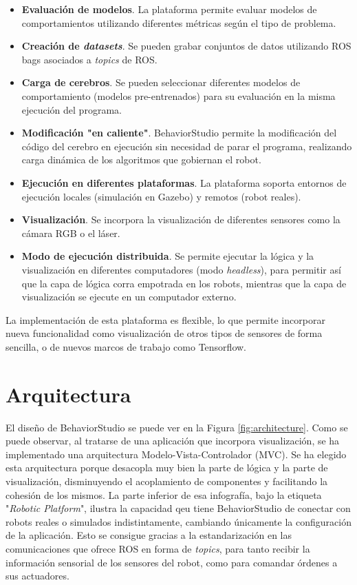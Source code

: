 \begin{itemize}
    \item \textbf{Evaluación de modelos}. La plataforma permite evaluar modelos de comportamientos utilizando diferentes métricas según el tipo de problema.
    \item \textbf{Creación de \textit{datasets}}. Se pueden grabar conjuntos de datos utilizando ROS bags asociados a \textit{topics} de ROS.
    \item \textbf{Carga de cerebros}. Se pueden seleccionar diferentes modelos de comportamiento (modelos pre-entrenados) para su evaluación en la misma ejecución del programa.
    \item \textbf{Modificación "en caliente"}. BehaviorStudio permite la modificación del código del cerebro en ejecución sin necesidad de parar el programa, realizando carga dinámica de los algoritmos que gobiernan el robot.
    \item \textbf{Ejecución en diferentes plataformas}. La plataforma soporta entornos de ejecución locales (simulación en Gazebo) y remotos (robot reales).
    \item \textbf{Visualización}. Se incorpora la visualización de diferentes sensores como la cámara RGB o el láser.
    \item \textbf{Modo de ejecución distribuida}. Se permite ejecutar la lógica y la visualización en diferentes computadores (modo \textit{headless}), para permitir así que la capa de lógica corra empotrada en los robots, mientras que la capa de visualización se ejecute en un computador externo.
\end{itemize}

La implementación de esta plataforma es flexible, lo que permite incorporar nueva funcionalidad como visualización de otros tipos de sensores de forma sencilla, o de nuevos marcos de trabajo como Tensorflow.

\section{Arquitectura}

El diseño de BehaviorStudio se puede ver en la Figura \ref{fig:architecture}. Como se puede observar, al tratarse de una aplicación que incorpora visualización, se ha implementado una arquitectura Modelo-Vista-Controlador (MVC). Se ha elegido esta arquitectura porque desacopla muy bien la parte de lógica y la parte de visualización, disminuyendo el acoplamiento de componentes y facilitando la cohesión de los mismos. La parte inferior de esa infografía, bajo la etiqueta "\textit{Robotic Platform}", ilustra la capacidad qeu tiene BehaviorStudio de conectar con robots reales o simulados indistintamente, cambiando únicamente la configuración de la aplicación. Esto se consigue gracias a la estandarización en las comunicaciones que ofrece ROS en forma de \textit{topics}, para tanto recibir la información sensorial de los sensores del robot, como para comandar órdenes a sus actuadores.

